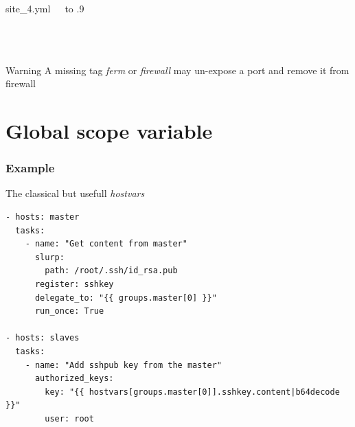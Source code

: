 \documentclass{beamer}
\begin{document}
\begin{frame}[fragile]
\begin{columns}
        \begin{block}{site\_4.yml}
        \footnotesize{
            \inputminted[firstline=1, lastline=6]
                        {yaml}{sources/site_4.yml}
            \inputminted[firstline=7, lastline=8,
                        frame=single,
                        framesep=0pt]
                        {yaml}{sources/site_4.yml}
            \inputminted[firstline=9]
                        {yaml}{sources/site_4.yml}
        }
        \end{block}
        \vbox to .9
\end{columns}
\end{frame}

\begin{frame}[fragile]
    \begin{alertblock}{Warning}
        A missing tag \textit{ferm} or \textit{firewall}
        may un-expose a port and remove it from firewall
    \end{alertblock}

\end{frame}

\section{Global scope variable}


\begin{frame}[fragile]
\frametitle{Example}
    \begin{exampleblock}{The classical but usefull \textit{hostvars}}
        \footnotesize{
        \begin{verbatim}
- hosts: master
  tasks:
    - name: "Get content from master"
      slurp:
        path: /root/.ssh/id_rsa.pub
      register: sshkey
      delegate_to: "{{ groups.master[0] }}"
      run_once: True

- hosts: slaves
  tasks:
    - name: "Add sshpub key from the master"
      authorized_keys:
        key: "{{ hostvars[groups.master[0]].sshkey.content|b64decode }}"
        user: root
        \end{verbatim}
        }
    \end{exampleblock}
\end{frame}
\end{document}
